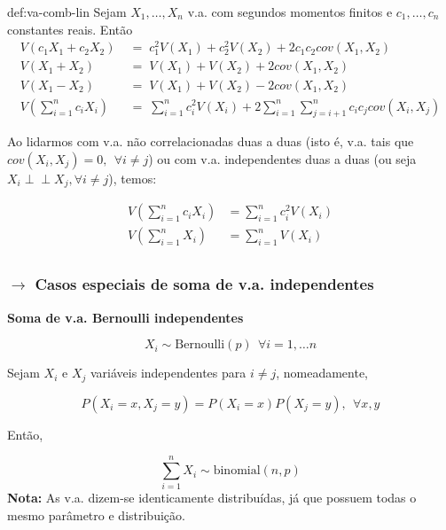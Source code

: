\begin{theo}{def:va-comb-lin}\label{def:va-comb-lin}
    \noindent Sejam $X_1, \dots, X_n$ v.a. com segundos momentos finitos e $c_1, \dots, c_n$ constantes reais. Então
    $$
        \begin{aligned}
            V(c_1X_1 + c_2X_2)\; &=\; c_1^2V(X_1) + c_2^2V(X_2) + 2 c_1c_2cov(X_1,X_2)\\[4pt]
            V(X_1 + X_2)\; &=\; V(X_1) + V(X_2) + 2 cov(X_1,X_2)\\[4pt]
            V(X_1 - X_2)\; &=\; V(X_1) + V(X_2) - 2 cov(X_1,X_2)\\[4pt]
            V\left(\sum_{i = 1}^{n} c_i X_i\right)\; &=\; \sum_{i = 1}^{n} c_i^2 V(X_i) + 2\sum_{i = 1}^n \sum_{j = i + 1}^n c_i c_j cov(X_i,X_j)
        \end{aligned}
    $$

    \noindent Ao lidarmos com v.a. não correlacionadas duas a duas (isto é, v.a. tais que $cov(X_i,X_j) = 0,\;\, \forall i \neq j$) ou com v.a. independentes duas a duas (ou seja $X_i \perp \!\!\! \perp X_j, \forall i \neq j$), temos:

    $$
        \begin{aligned}
            V\left(\sum_{i = 1}^{n} c_i X_i\right) &= \sum_{i = 1}^{n} c_i^2 V(X_i)\\
            V\left(\sum_{i = 1}^{n} X_i\right) &= \sum_{i = 1}^{n} V(X_i)\\
        \end{aligned}
    $$
\end{theo}

\newpage
\subsubsection[3.3.1 Casos especiais de soma de v.a. independentes]{$\pmb{\rightarrow}$ Casos especiais de soma de v.a. independentes}

{

\begin{mdframed}
    \noindent\textbf{Soma de v.a. Bernoulli independentes}

    $$
        X_i \sim \text{Bernoulli}(p)\;\, \forall i = 1, \dots n
    $$

    \noindent Sejam $X_i$ e $X_j$ variáveis independentes para $i \neq j$, nomeadamente,

    $$
        P(X_i = x, X_j = y) = P(X_i = x) P(X_j = y),\;\, \forall x,y
    $$

    \noindent Então,

    \vspace{-1.5 em}
    $$
        \sum_{i = 1}^n X_i \sim \text{binomial}(n,p)
    $$
    \noindent \textbf{Nota:} As v.a. dizem-se identicamente distribuídas, já que possuem todas o mesmo parâmetro e distribuição.
\end{mdframed}
}

